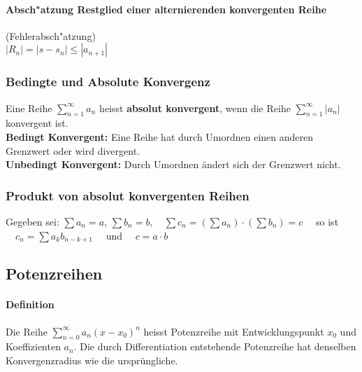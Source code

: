 \paragraph{Absch"atzung Restglied einer alternierenden konvergenten
  Reihe} (Fehlerabsch"atzung)\\
  $|R_n| = |s-s_n|\leq  |a_{n+1}|$


\subsubsection{Bedingte und Absolute Konvergenz}
  Eine Reihe $\sum\limits_{n=1}^{\infty}a_n$ heisst \textbf{absolut konvergent},
wenn die Reihe $\sum\limits_{n=1}^{\infty}|a_n|$ konvergent ist.\\
\textbf{Bedingt Konvergent:} Eine Reihe hat durch Umordnen einen anderen
Grenzwert oder wird divergent.\\
\textbf{Unbedingt Konvergent:} Durch Umordnen \"andert sich der Grenzwert nicht.

\subsubsection{Produkt von absolut konvergenten Reihen} 
  Gegeben sei: $\sum a_n=a$, \quad $\sum b_n=b, \quad \sum c_n = (\sum a_n)
\cdot (\sum b_n) = c \quad $ so ist $ \quad c_n=\sum a_kb_{n-k+1} \quad $ und $ \quad c = a \cdot b $



\subsection{Potenzreihen}

\paragraph{Definition} 

  Die Reihe $ \sum\limits_{n=0}^{\infty} a_n (x-x_0)^n $ heisst Potenzreihe mit
Entwicklungspunkt $x_0$ und Koeffizienten $a_n$. Die durch Differentiation
entstehende Potenzreihe hat denselben Konvergenzradius wie die ursprüngliche. \\


